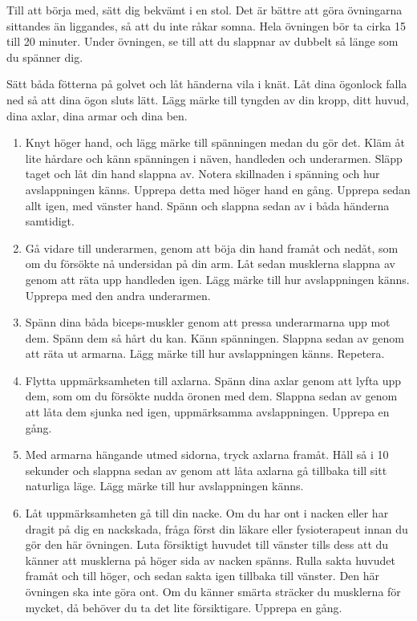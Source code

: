 \documentclass[swedish,a4paper]{book}
\begin{document}
Till att börja med, sätt dig bekvämt i en stol. Det är bättre att göra övningarna sittandes än liggandes, så att du inte råkar somna. Hela övningen bör ta cirka 15 till 20 minuter. Under övningen, se till att du slappnar av dubbelt så länge som du spänner dig.

Sätt båda fötterna på golvet och låt händerna vila i knät. Låt dina ögonlock falla ned så att dina ögon sluts lätt. Lägg märke till tyngden av din kropp, ditt huvud, dina axlar, dina armar och dina ben.

\begin{enumerate}

\item 
Knyt höger hand, och lägg märke till spänningen medan du gör det. Kläm åt lite hårdare och känn spänningen i näven, handleden och underarmen. Släpp taget och låt din hand slappna av. Notera skillnaden i spänning och hur avslappningen känns. Upprepa detta med höger hand en gång. Upprepa sedan allt igen, med vänster hand. Spänn och slappna sedan av i båda händerna samtidigt.

\item 
Gå vidare till underarmen, genom att böja din hand framåt och nedåt, som om du försökte nå undersidan på din arm. Låt sedan musklerna slappna av genom att räta upp handleden igen. Lägg märke till hur avslappningen känns. Upprepa med den andra underarmen.

\item 
Spänn dina båda biceps-muskler genom att pressa underarmarna upp mot dem. Spänn dem så hårt du kan. Känn spänningen. Slappna sedan av genom att räta ut armarna. Lägg märke till hur avslappningen känns. Repetera.

\item 
Flytta uppmärksamheten till axlarna. Spänn dina axlar genom att lyfta upp dem, som om du försökte nudda öronen med dem. Slappna sedan av genom att låta dem sjunka ned igen, uppmärksamma avslappningen. Upprepa en gång. 

\item 
Med armarna hängande utmed sidorna, tryck axlarna framåt. Håll så i 10 sekunder och slappna sedan av genom att låta axlarna gå tillbaka till sitt naturliga läge. Lägg märke till hur avslappningen känns.

\item 
Låt uppmärksamheten gå till din nacke. Om du har ont i nacken eller har dragit på dig en nackskada, fråga först din läkare eller fysioterapeut innan du gör den här övningen. Luta försiktigt huvudet till vänster tills dess att du känner att musklerna på höger sida av nacken spänns. Rulla sakta huvudet framåt och till höger, och sedan sakta igen tillbaka till vänster. Den här övningen ska inte göra ont. Om du känner smärta sträcker du musklerna för mycket, då behöver du ta det lite försiktigare. Upprepa en gång.


\end{enumerate}
\end{document}
